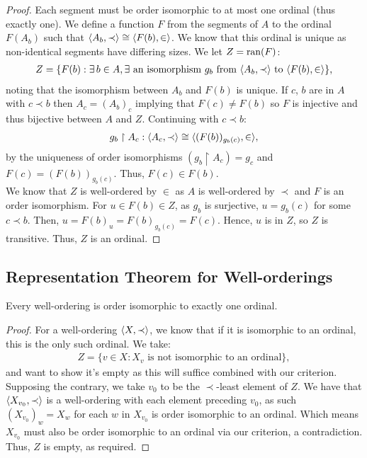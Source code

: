 \begin{proof}
    Each segment must be order isomorphic to at most one
    ordinal (thus exactly one). We define a function $F$ from
    the segments of $A$ to the ordinal $F(A_b)$ such
    that $\langle A_b, \prec \rangle \cong \langle F(b), \in \rangle$.
    We know that this ordinal is unique as non-identical
    segments have differing sizes.
    We let $Z = \operatorname{ran}(F)$: \begin{align*}
        Z = \{F(b) : \exists \, b \in A, 
        \exists \text{ an isomorphism } g_b 
        \text{ from } \langle A_b, \prec \rangle 
        \text{ to } \langle F(b), \in \rangle\},
    \end{align*} noting that the isomorphism between
    $A_b$ and $F(b)$ is unique. If $c$, $b$ are in $A$ with
    $c \prec b$ then $A_c = (A_b)_c$ implying that
    $F(c) \neq F(b)$ so $F$ is injective and thus bijective
    between $A$ and $Z$.
    Continuing with $c \prec b$: \begin{align*}
        g_b \upharpoonright A_c :
        \langle A_c, \prec \rangle \cong 
        \langle (F(b))_{g_b(c)}, \in \rangle,
    \end{align*} by the uniqueness of order isomorphisms
    $(g_b \upharpoonright A_c) = g_c$ and $F(c) = (F(b))_{g_b(c)}$.
    Thus, $F(c) \in F(b)$.
    \\[\baselineskip]
    We know that $Z$ is well-ordered by $\in$ as 
    $A$ is well-ordered by $\prec$ and $F$ is an
    order isomorphism. For $u \in F(b) \in Z$,
    as $g_b$ is surjective, $u = g_b(c)$ for some $c \prec b$.
    Then, $u = F(b)_u = F(b)_{g_b(c)} = F(c)$. Hence, $u$ is
    in $Z$, so $Z$ is transitive. Thus, $Z$ is an ordinal.
\end{proof}

\newpage

\subsection{Representation Theorem for Well-orderings}

Every well-ordering is order isomorphic to 
exactly one ordinal.

\begin{proof}
    For a well-ordering $\langle X, \prec \rangle$, we know that if it
    is isomorphic to an ordinal, this is the only such ordinal.
    We take: \begin{align*}
        Z = \{v \in X : X_v \text{ is not isomorphic to an ordinal}\},
    \end{align*} and want to show it's empty as this will suffice
    combined with our criterion. Supposing the
    contrary, we take $v_0$ to be the $\prec$-least element
    of $Z$. We have that $\langle X_{v_0}, \prec \rangle$ is a well-ordering
    with each element preceding $v_0$, as such $(X_{v_0})_w = X_w$
    for each $w$ in $X_{v_0}$ is order isomorphic to an ordinal.
    Which means $X_{v_0}$ must also be order isomorphic to an ordinal
    via our criterion, a contradiction. Thus, $Z$ is empty, as required.
\end{proof}